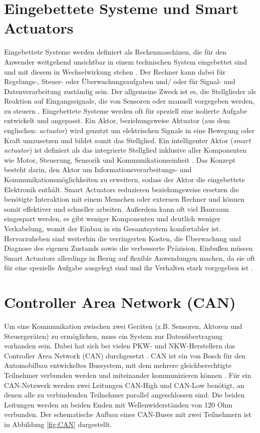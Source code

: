 \section{Eingebettete Systeme und Smart Actuators}
Eingebettete Systeme werden definiert als Rechenmaschinen, die für den Anwender weitgehend unsichtbar in einem technischen System eingebettet sind und mit diesem in Wechselwirkung stehen \cite[S.8]{Gessler2014}. Der Rechner kann dabei für Regelungs-, Steuer- oder Überwachungsaufgaben und/ oder für Signal- und Datenverarbeitung zuständig sein. Der allgemeine Zweck ist es, die Stellglieder als Reaktion auf Eingangssignale, die von Sensoren oder manuell vorgegeben werden, zu steuern \cite[S.1]{Broy2003}. Eingebettete Systeme werden oft für speziell eine isolierte Aufgabe entwickelt und angepasst.
Ein Aktor, beziehungsweise Aktuator (aus dem englischen: \textit{actuator}) wird genutzt um elektrischen Signale in eine Bewegung oder Kraft umzusetzen und bildet somit das Stellglied. 
Ein intelligenter Aktor (\textit{smart actuator}) ist definiert als das integrierte Stellglied inklusive aller Komponenten wie Motor, Steuerung, Sensorik und Kommunikationseinheit \cite[S.442]{smartactuator}.
Das Konzept besteht darin, den Aktor um Informationsverarbeitungs- und Kommunikationsmöglichkeiten zu erweitern, sodass der Aktor die eingebettete Elektronik enthält.
Smart Actuators reduzieren beziehungsweise ersetzen die benötigte Interaktion mit einem Menschen oder externen Rechner und können somit effektiver und schneller arbeiten. Außerdem kann oft viel Bauraum eingespart werden, es gibt weniger Komponenten und deutlich weniger Verkabelung, womit der Einbau in ein Gesamtsystem komfortabler ist. Hervorzuheben sind weiterhin die verringerten Kosten, die Überwachung und Diagnose des eigenen Zustands sowie die verbesserte Präzision. Einbußen müssen Smart Actuators allerdings in Bezug auf flexible Anwendungen machen, da sie oft für eine spezielle Aufgabe ausgelegt sind und ihr Verhalten stark vorgegeben ist \cite[S.4]{smartaktor}.

\section{Controller Area Network (CAN)}\label{sec:CAN_KAP2}
Um eine Kommunikation zwischen zwei Geräten (z.B. Sensoren, Aktoren und Steuergeräten) zu ermöglichen, muss ein System zur Datenübertragung vorhanden sein. Dabei hat sich bei vielen PKW- und NKW-Herstellern  das Controller Area Network (CAN) durchgesetzt \cite[S.57]{Werner2014}. CAN ist ein von Bosch für den Automobilbau entwickeltes Bussystem, mit dem mehrere gleichberechtigte Teilnehmer verbunden werden und miteinander kommunizieren können \cite[S. 278]{Woern2006}.
Für ein CAN-Netzwerk werden zwei Leitungen CAN-High und CAN-Low benötigt, an denen alle zu verbindenden Teilnehmer parallel angeschlossen sind. Die beiden Leitungen werden an beiden Enden mit Wellenwiderständen von 120 Ohm verbunden. Der schematische Aufbau eines CAN-Buses mit zwei Teilnehmern ist in Abbildung \ref{fig:CAN} dargestellt. 


